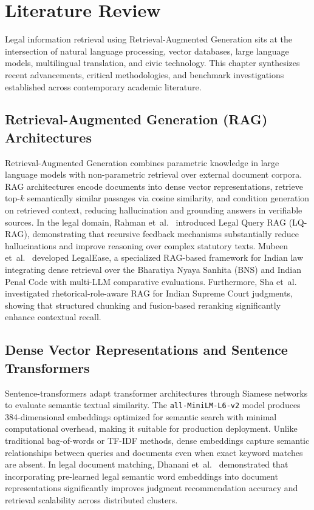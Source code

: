 \documentclass[12pt,a4paper]{report}
\begin{document}
\chapter{Literature Review}

Legal information retrieval using Retrieval-Augmented Generation sits at the intersection of natural language processing, vector databases, large language models, multilingual translation, and civic technology. This chapter synthesizes recent advancements, critical methodologies, and benchmark investigations established across contemporary academic literature.

\section{Retrieval-Augmented Generation (RAG) Architectures}
Retrieval-Augmented Generation combines parametric knowledge in large language models with non-parametric retrieval over external document corpora. RAG architectures encode documents into dense vector representations, retrieve top-$k$ semantically similar passages via cosine similarity, and condition generation on retrieved context, reducing hallucination and grounding answers in verifiable sources. In the legal domain, Rahman et~al.~\cite{ref_rahman2025_legalqueryrag} introduced Legal Query RAG (LQ-RAG), demonstrating that recursive feedback mechanisms substantially reduce hallucinations and improve reasoning over complex statutory texts. Mubeen et~al.~\cite{ref_mubeen2025_legalease} developed LegalEase, a specialized RAG-based framework for Indian law integrating dense retrieval over the Bharatiya Nyaya Sanhita (BNS) and Indian Penal Code with multi-LLM comparative evaluations. Furthermore, Sha et~al.~\cite{ref_sha2026_rhetorical} investigated rhetorical-role-aware RAG for Indian Supreme Court judgments, showing that structured chunking and fusion-based reranking significantly enhance contextual recall.

\section{Dense Vector Representations and Sentence Transformers}
Sentence-transformers adapt transformer architectures through Siamese networks to evaluate semantic textual similarity. The \texttt{all-MiniLM-L6-v2} model produces 384-dimensional embeddings optimized for semantic search with minimal computational overhead, making it suitable for production deployment. Unlike traditional bag-of-words or TF-IDF methods, dense embeddings capture semantic relationships between queries and documents even when exact keyword matches are absent. In legal document matching, Dhanani et~al.~\cite{ref_dhanani2022_scalable} demonstrated that incorporating pre-learned legal semantic word embeddings into document representations significantly improves judgment recommendation accuracy and retrieval scalability across distributed clusters.
\end{document}
